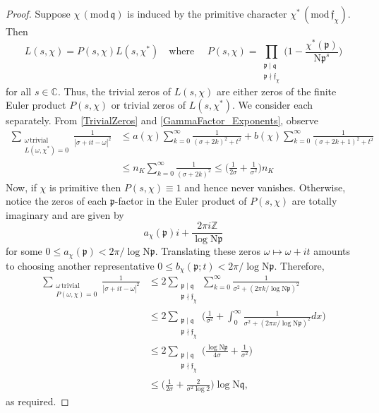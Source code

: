 \documentclass[12pt,psamsfonts]{amsart}
\theoremstyle{definition}
\theoremstyle{remark}
\numberwithin{equation}{section}
\theoremstyle{plain}
\theoremstyle{remark}
\renewcommand{\1}{ {\bf 1}}
\newcommand{\kf}{\mathfrak{f}}
\renewcommand{\pmod}[1]{\, (\mathrm{mod} {\, #1})}
\newcommand{\N}{\mathrm{N}}
\newcommand{\kp}{\mathfrak{p}}
\newcommand{\kq}{\mathfrak{q}}
\newcommand{\Z}{\mathbb{Z}}
\begin{document}
\begin{proof} Suppose $\chi \pmod{\kq}$ is induced by the primitive character $\chi^* \pmod{\kf_{\chi}}$. Then 
\[
L(s,\chi) = P(s, \chi) L(s,\chi^*) \quad \text{where } \quad P(s, \chi) = \prod_{\substack{ \kp \mid \kq \\ \kp \nmid \kf_{\chi}} } \Big(1 - \frac{\chi^*(\kp)}{\N\kp^{s}} \Big)
\]
for all $s \in \mathbb{C}$. Thus, the trivial zeros of $L(s,\chi)$ are either zeros of the finite Euler product $P(s,\chi)$ or trivial zeros of $L(s,\chi^*)$. We consider each separately. From \eqref{TrivialZeros} and \eqref{GammaFactor_Exponents}, observe
\begin{align*}
 \sum_{\substack{ \omega \, \mathrm{ trivial} \\ L(\omega, \chi^*) = 0} } \frac{1}{|\sigma+it-\omega|^2} 
 & \leq a(\chi) \sum_{k=0}^{\infty}  \frac{1}{(\sigma+2k)^2 + t^2}  + b(\chi) \sum_{k=0}^{\infty} \frac{1}{(\sigma+2k+1)^2 +t^2} \\
 & \leq n_K \sum_{k=0}^{\infty}  \frac{1}{(\sigma+2k)^2} \leq \Big( \frac{1}{2\sigma} + \frac{1}{\sigma^2} \Big) n_K
\end{align*}
Now, if $\chi$ is primitive then $P(s,\chi) \equiv 1$ and hence never vanishes. Otherwise, notice the zeros of each $\kp$-factor in the Euler product of $P(s,\chi)$ are totally imaginary and are given by
\[
 a_{\chi}(\kp) i + \frac{2\pi i \Z}{\log \N\kp}
\]
for some $0 \leq a_{\chi}(\kp)  < 2\pi/\log \N\kp$.  Translating these zeros $\omega \mapsto \omega + it$ amounts to choosing another representative $0 \leq b_{\chi}(\kp; t) < 2\pi /\log\N\kp$. Therefore, 
\begin{align*}
 \sum_{\substack{ \omega \, \mathrm{ trivial} \\ P(\omega, \chi) = 0} } \frac{1}{|\sigma+it-\omega|^2} 
 & \leq   2 \sum_{ \substack{ \kp \mid \kq \\ \kp \nmid \kf_{\chi} } } \sum_{k=0}^{\infty}  \frac{1}{\sigma^2 + (2\pi k/\log \N\kp)^2} \\
 & \leq   2 \sum_{ \substack{ \kp \mid \kq \\ \kp \nmid \kf_{\chi} } }\Big( \frac{1}{\sigma^2} +  \int_0^{\infty} \frac{1}{\sigma^2 + (2\pi x/\log \N\kp)^2 } dx \Big) \\
  & \leq  2 \sum_{ \substack{ \kp \mid \kq \\ \kp \nmid \kf_{\chi} } }\Big(  \frac{\log \N\kp}{4 \sigma} +  \frac{1}{\sigma^2} \Big) \\
  & \leq   \Big(\frac{1}{2 \sigma} +  \frac{2}{\sigma^2 \log 2}  \Big) \log \N\kq,
\end{align*}
as required.  
\end{proof}
\end{document}
